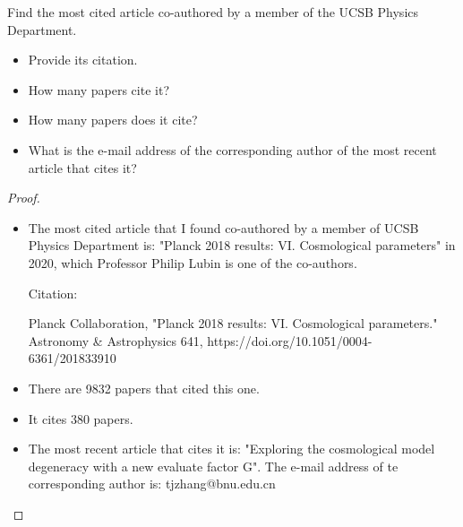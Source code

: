 \documentclass{article}
\begin{document}
\hfil


\begin{ques}
    Find the most cited article co-authored by a member of the UCSB Physics Department.
    \begin{itemize}
        \item[a.] Provide its citation.
        \item[b.] How many papers cite it?
        \item[c.] How many papers does it cite?
        \item[d.] What is the e-mail address of the corresponding author of the most recent article that cites it?
\end{itemize}
\end{ques}

\begin{proof}
    \begin{itemize}
        \item[a.] The most cited article that I found co-authored by a member of UCSB Physics Department is: "Planck 2018 results: VI. Cosmological parameters" in 2020, which Professor Philip Lubin is one of the co-authors.
        
        Citation:

        Planck Collaboration, "Planck 2018 results: VI. Cosmological parameters." Astronomy \& Astrophysics 641, https://doi.org/10.1051/0004-6361/201833910

        \item[b.] There are 9832 papers that cited this one.
        \item[c.] It cites 380 papers.
        \item[d.] The most recent article that cites it is: "Exploring the cosmological model degeneracy with a new evaluate factor G". The e-mail address of te corresponding author is: tjzhang@bnu.edu.cn  
    \end{itemize}
\end{proof}
\end{document}

